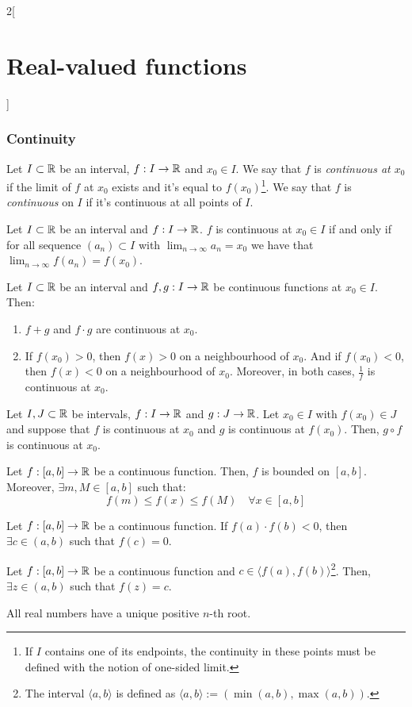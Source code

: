 \documentclass[../../../main_math.tex]{subfiles}
\begin{document}
\begin{multicols}{2}[\section{Real-valued functions}]
  \subsubsection{Continuity}
  \begin{definition}
    Let $I\subset\mathbb{R}$ be an interval, $f:I\rightarrow\mathbb{R}$ and $x_0\in I$. We say that $f$ is \emph{continuous at $x_0$} if the limit of $f$ at $x_0$ exists and it's equal to $f(x_0)$\footnote{If $I$ contains one of its endpoints, the continuity in these points must be defined with the notion of one-sided limit.}. We say that $f$ is \emph{continuous} on $I$ if it's continuous at all points of $I$.
  \end{definition}
  \begin{lemma}
    Let $I\subset\mathbb{R}$ be an interval and $f:I\rightarrow\mathbb{R}$. $f$ is continuous at $x_0\in I$ if and only if for all sequence $(a_n)\subset I$ with $\displaystyle\lim_{n\to\infty} a_n=x_0$ we have that $\displaystyle\lim_{n\to\infty} f(a_n)=f(x_0)$.
  \end{lemma}
  \begin{proposition}
    Let $I\subset\mathbb{R}$ be an interval and $f,g:I\rightarrow \mathbb{R}$ be continuous functions at $x_0\in I$. Then:
    \begin{enumerate}
      \item $f+g$ and $f\cdot g$ are continuous at $x_0$.
      \item If $f(x_0)>0$, then $f(x)>0$ on a neighbourhood of $x_0$. And if $f(x_0)<0$, then $f(x)<0$ on a neighbourhood of $x_0$. Moreover, in both cases, $\frac{1}{f}$ is continuous at $x_0$.
    \end{enumerate}
  \end{proposition}
  \begin{proposition}
    Let $I,J\subset\mathbb{R}$ be intervals, $f:I\rightarrow\mathbb{R}$ and $g:J\rightarrow\mathbb{R}$. Let $x_0\in I$ with $f(x_0)\in J$ and suppose that $f$ is continuous at $x_0$ and $g$ is continuous at $f(x_0)$. Then, $g\circ f$ is continuous at $x_0$.
  \end{proposition}
  \begin{theorem}\label{RVF:weierstrass}
    Let $f:[a,b]\rightarrow\mathbb{R}$ be a continuous function. Then, $f$ is bounded on $[a,b]$. Moreover, $\exists m,M\in[a,b]$ such that: $$f(m)\leq f(x)\leq f(M)\quad\forall x\in [a,b]$$
  \end{theorem}
  \begin{theorem}
    Let $f:[a,b]\rightarrow\mathbb{R}$ be a continuous function. If $f(a)\cdot f(b)<0$, then $\exists c\in(a,b)$ such that $f(c)=0$.
  \end{theorem}
  \begin{corollary}
    Let $f:[a,b]\rightarrow\mathbb{R}$ be a continuous function and $c\in\langle f(a), f(b)\rangle$\footnote{The interval $\langle a,b\rangle$ is defined as $\langle a,b\rangle:=(\min(a,b),\max(a,b))$.}. Then, $\exists z\in (a,b)$ such that $f(z)=c$.
  \end{corollary}
  \begin{corollary}
    All real numbers have a unique positive $n$-th root.
  \end{corollary}

\end{multicols}
\end{document}
